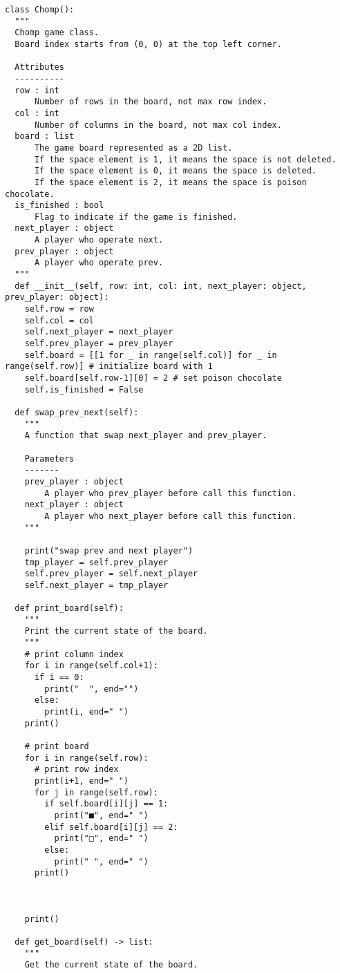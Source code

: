 \documentclass[uplatex,dvipdfmx,a4paper,10pt]{jsarticle}
\theoremstyle{definition}
\begin{document}
\begin{lstlisting}[caption={CHOMPゲームのクラス}]
class Chomp():
  """
  Chomp game class.
  Board index starts from (0, 0) at the top left corner.
  
  Attributes
  ----------
  row : int
      Number of rows in the board, not max row index.
  col : int
      Number of columns in the board, not max col index.
  board : list
      The game board represented as a 2D list.
      If the space element is 1, it means the space is not deleted.
      If the space element is 0, it means the space is deleted.
      If the space element is 2, it means the space is poison chocolate.
  is_finished : bool
      Flag to indicate if the game is finished.
  next_player : object
      A player who operate next.
  prev_player : object
      A player who operate prev.
  """
  def __init__(self, row: int, col: int, next_player: object, prev_player: object):
    self.row = row
    self.col = col
    self.next_player = next_player
    self.prev_player = prev_player
    self.board = [[1 for _ in range(self.col)] for _ in range(self.row)] # initialize board with 1
    self.board[self.row-1][0] = 2 # set poison chocolate
    self.is_finished = False

  def swap_prev_next(self):
    """
    A function that swap next_player and prev_player.

    Parameters
    -------
    prev_player : object
        A player who prev_player before call this function.
    next_player : object
        A player who next_player before call this function.
    """

    print("swap prev and next player")
    tmp_player = self.prev_player
    self.prev_player = self.next_player
    self.next_player = tmp_player

  def print_board(self):
    """
    Print the current state of the board.
    """
    # print column index
    for i in range(self.col+1):
      if i == 0:
        print("  ", end="")
      else:
        print(i, end=" ")
    print()

    # print board
    for i in range(self.row):
      # print row index
      print(i+1, end=" ")
      for j in range(self.row):
        if self.board[i][j] == 1:
          print("■", end=" ")
        elif self.board[i][j] == 2:
          print("□", end=" ")
        else:
          print(" ", end=" ")
      print()
    


    print()

  def get_board(self) -> list:
    """
    Get the current state of the board.
    

\end{lstlisting}
\end{document}
